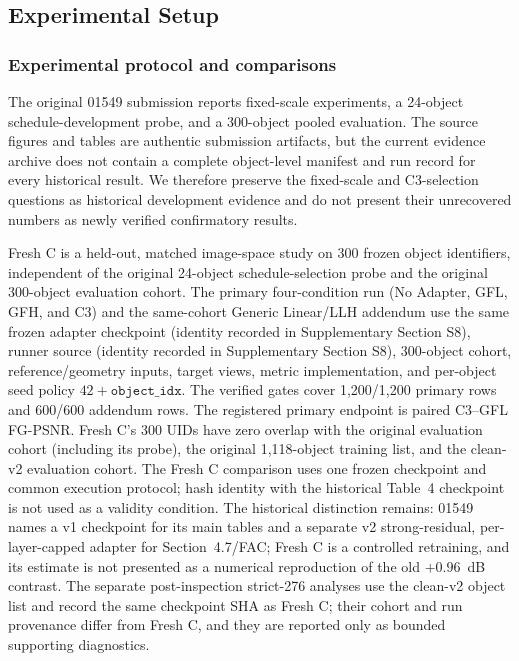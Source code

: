 \documentclass[times,twocolumn,final]{elsarticle}
\providecommand{\DIFadd}[1]{{\protect\color{blue} \sf #1}} %
\providecommand{\DIFaddbegin}{} %
\providecommand{\DIFaddend}{} %
\begin{document}
\subsection{Experimental Setup}
\label{subsec:setup}

\subsubsection{Experimental protocol and comparisons}

  \DIFaddbegin \DIFadd{The original 01549 submission reports fixed-scale experiments, a 24-object schedule-development probe, and a 300-object pooled evaluation. The source figures and tables are authentic submission artifacts, but the current evidence archive does not contain a complete object-level manifest and run record for every historical result. We therefore preserve the fixed-scale }\DIFaddend and   \DIFaddbegin \DIFadd{C3-selection questions as historical development evidence and do not present their unrecovered numbers as newly verified confirmatory results.
}\DIFaddend 

  \DIFaddbegin \DIFadd{Fresh C is a held-out, matched image-space study on 300 frozen object identifiers, independent of the original 24-object schedule-selection probe and the original 300-object evaluation cohort. The primary four-condition run (No Adapter, GFL, GFH, and C3) and the same-cohort Generic Linear/LLH addendum use the same frozen adapter checkpoint (identity recorded in Supplementary Section S8), runner source (identity recorded in Supplementary Section S8), 300-object cohort, reference/geometry inputs}\DIFaddend , target views,   \DIFaddbegin \DIFadd{metric implementation, }\DIFaddend and  
 \DIFaddbegin \DIFadd{per-object seed policy $42+\texttt{object\_idx}$. The verified gates cover 1,200/1,200 primary rows and 600/600 addendum rows. The registered primary endpoint is paired C3--GFL FG-PSNR. Fresh C's 300 UIDs have zero overlap with the original evaluation cohort (including its probe), }\DIFaddend the   \DIFaddbegin \DIFadd{original 1,118-object training list, and the clean-v2 evaluation cohort. The Fresh C comparison uses one frozen checkpoint and common execution protocol; hash identity with the historical Table~4 checkpoint is not used as a validity condition. The historical distinction remains: 01549 names a v1 checkpoint for its main tables and a separate v2 strong-residual, per-layer-capped adapter for Section~4.7/FAC; Fresh C is a controlled retraining, and its estimate is not presented as a numerical reproduction of the old $+0.96$~dB contrast. The separate post-inspection strict-276 analyses use the clean-v2 object list and record the same checkpoint SHA as Fresh C; their cohort and run provenance differ from Fresh C, and they are reported only as bounded supporting diagnostics}\DIFaddend .
\end{document}
